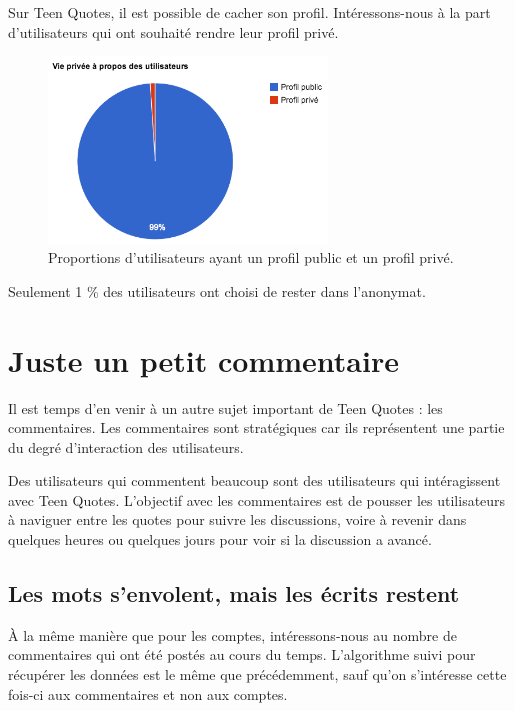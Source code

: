 \documentclass{report}
\begin{document}
	Sur Teen Quotes, il est possible de cacher son profil. Intéressons-nous à la part d'utilisateurs qui ont souhaité rendre leur profil privé.

	\begin{figure}[H]
		\center
		\includegraphics[width=280px]{images/viePriveeUtilisateurs.png}
		\caption{Proportions d'utilisateurs ayant un profil public et un profil privé.}
	\end{figure}

	Seulement 1 \% des utilisateurs ont choisi de rester dans l'anonymat.

	\chapter{Juste un petit commentaire}
	Il est temps d'en venir à un autre sujet important de Teen Quotes : les commentaires. Les commentaires sont stratégiques car ils représentent une partie du degré d'interaction des utilisateurs.

	Des utilisateurs qui commentent beaucoup sont des utilisateurs qui intéragissent avec Teen Quotes. L'objectif avec les commentaires est de pousser les utilisateurs à naviguer entre les quotes pour suivre les discussions, voire à revenir dans quelques heures ou quelques jours pour voir si la discussion a avancé.

	\section{Les mots s'envolent, mais les écrits restent}
	À la même manière que pour les comptes, intéressons-nous au nombre de commentaires qui ont été postés au cours du temps. L'algorithme suivi pour récupérer les données est le même que précédemment, sauf qu'on s'intéresse cette fois-ci aux commentaires et non aux comptes.\\
\end{document}
